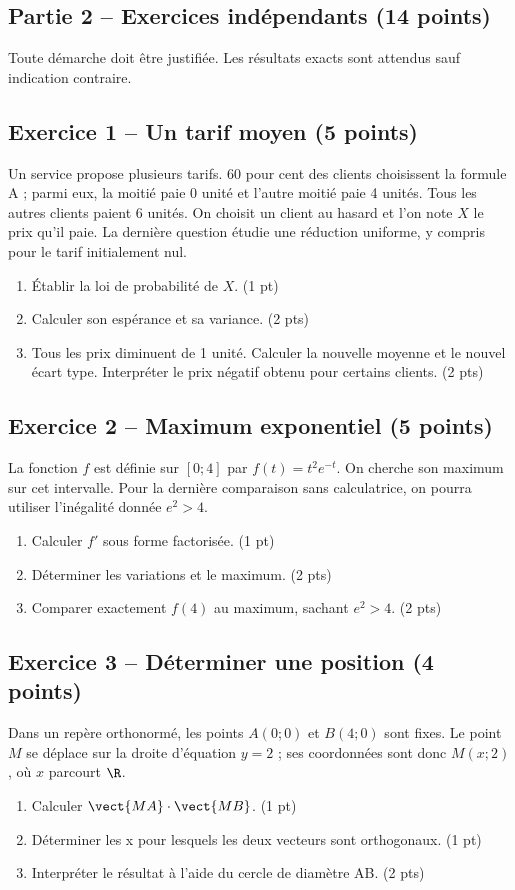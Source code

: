 \clearpage\subsection*{Partie 2 -- Exercices indépendants (14 points)}
Toute démarche doit être justifiée. Les résultats exacts sont attendus sauf indication contraire.
\subsection*{Exercice 1 -- Un tarif moyen (5 points)}
Un service propose plusieurs tarifs. 60 pour cent des clients choisissent la formule A ; parmi eux, la moitié paie 0 unité et l’autre moitié paie 4 unités. Tous les autres clients paient 6 unités. On choisit un client au hasard et l’on note $X$ le prix qu’il paie. La dernière question étudie une réduction uniforme, y compris pour le tarif initialement nul.
\begin{enumerate}
\item Établir la loi de probabilité de $X$. \hfill(1 pt)
\item Calculer son espérance et sa variance. \hfill(2 pts)
\item Tous les prix diminuent de 1 unité. Calculer la nouvelle moyenne et le nouvel écart type. Interpréter le prix négatif obtenu pour certains clients. \hfill(2 pts)
\end{enumerate}
\subsection*{Exercice 2 -- Maximum exponentiel (5 points)}
La fonction $f$ est définie sur $[0;4]$ par $f(t)=t^2e^{-t}$. On cherche son maximum sur cet intervalle. Pour la dernière comparaison sans calculatrice, on pourra utiliser l’inégalité donnée $e^2>4$.
\begin{enumerate}
\item Calculer $f\prime$ sous forme factorisée. \hfill(1 pt)
\item Déterminer les variations et le maximum. \hfill(2 pts)
\item Comparer exactement $f(4)$ au maximum, sachant $e^2>4$. \hfill(2 pts)
\end{enumerate}
\subsection*{Exercice 3 -- Déterminer une position (4 points)}
Dans un repère orthonormé, les points $A(0;0)$ et $B(4;0)$ sont fixes. Le point $M$ se déplace sur la droite d’équation $y=2$ ; ses coordonnées sont donc $M(x;2)$, où $x$ parcourt $\R$.
\begin{enumerate}
\item Calculer $\vect{MA}\cdot\vect{MB}$. \hfill(1 pt)
\item Déterminer les x pour lesquels les deux vecteurs sont orthogonaux. \hfill(1 pt)
\item Interpréter le résultat à l’aide du cercle de diamètre AB. \hfill(2 pts)
\end{enumerate}
